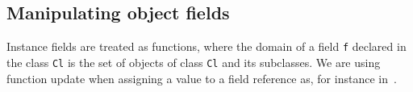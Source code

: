 \subsection{Manipulating object fields}
Instance fields are treated as functions, where the domain of a field \texttt{f} 
declared in the class \texttt{Cl} is the set of objects of class \texttt{Cl} and its subclasses.
We are using function update when assigning a value to a field reference as, for instance in~\cite{B00ppp}. 





